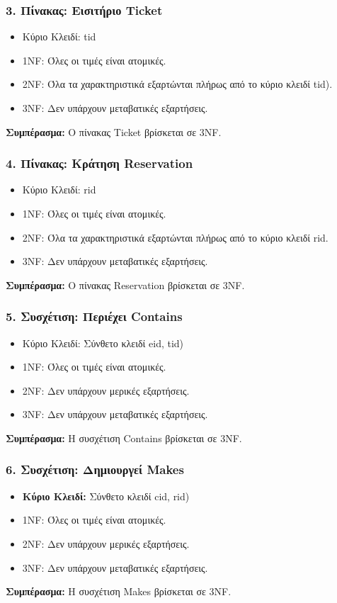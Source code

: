 \documentclass{article}
\begin{document}
\subsubsection*{3. Πίνακας: Εισιτήριο Ticket}
\begin{itemize}
    \item Κύριο Κλειδί: tid
    \item 1NF: Όλες οι τιμές είναι ατομικές.
    \item 2NF: Όλα τα χαρακτηριστικά εξαρτώνται πλήρως από το κύριο κλειδί tid).
    \item 3NF: Δεν υπάρχουν μεταβατικές εξαρτήσεις.
\end{itemize}
\textbf{Συμπέρασμα:} Ο πίνακας Ticket βρίσκεται σε 3NF.

\subsubsection*{4. Πίνακας: Κράτηση Reservation}
\begin{itemize}
    \item Κύριο Κλειδί: rid
    \item 1NF: Όλες οι τιμές είναι ατομικές.
    \item 2NF: Όλα τα χαρακτηριστικά εξαρτώνται πλήρως από το κύριο κλειδί rid.
    \item 3NF: Δεν υπάρχουν μεταβατικές εξαρτήσεις.
\end{itemize}
\textbf{Συμπέρασμα:} Ο πίνακας Reservation βρίσκεται σε 3NF.

\subsubsection*{5. Συσχέτιση: Περιέχει Contains}
\begin{itemize}
    \item Κύριο Κλειδί: Σύνθετο κλειδί eid, tid)
    \item 1NF: Όλες οι τιμές είναι ατομικές.
    \item 2NF: Δεν υπάρχουν μερικές εξαρτήσεις.
    \item 3NF: Δεν υπάρχουν μεταβατικές εξαρτήσεις.
\end{itemize}
\textbf{Συμπέρασμα:} Η συσχέτιση Contains βρίσκεται σε 3NF.

\subsubsection*{6. Συσχέτιση: Δημιουργεί Makes}
\begin{itemize}
    \item \textbf{Κύριο Κλειδί:} Σύνθετο κλειδί cid, rid)
    \item 1NF: Όλες οι τιμές είναι ατομικές.
    \item 2NF: Δεν υπάρχουν μερικές εξαρτήσεις.
    \item 3NF: Δεν υπάρχουν μεταβατικές εξαρτήσεις.
\end{itemize}
\textbf{Συμπέρασμα:} Η συσχέτιση Makes βρίσκεται σε 3NF.
\end{document}
